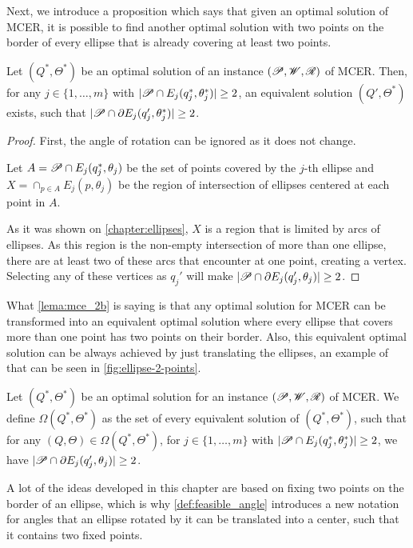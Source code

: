 Next, we introduce a proposition which says that given an optimal solution of MCER, it is possible to find another optimal solution with two points on the border of every ellipse that is already covering at least two points.

\begin{proposicao}\label{lema:mce_2b}
	Let $(Q^*, \Theta^*)$ be an optimal solution of an instance $(\mathscr{P}, \mathscr{W}, \mathscr{R})$ of MCER. 
	Then, for any $j\in\{1, \dots, m\}$ with $|\mathscr{P} \cap E_j(q_j^*, \theta_j^*)|\ge2$, 
	an equivalent solution $(Q', \Theta^*)$ exists, such that $|\mathscr{P} \cap \partial E_j(q_j', \theta_j^*)|\ge 2$.
\end{proposicao}

\begin{proof}
	First, the angle of rotation can be ignored as it does not change.
	
	Let $A=\mathscr{P} \cap E_j(q_j^*, \theta_j)$ be the set of points covered by the $j$-th ellipse and $X=\cap_{p \in A}E_j(p, \theta_j)$ be the region of intersection of ellipses centered at each point in $A$.

	As it was shown on \autoref{chapter:ellipses}, $X$ is a region that is limited by arcs of ellipses. As this region is the non-empty intersection of more than one ellipse, there are at least two of these arcs that encounter at one point, creating a vertex. Selecting any of these vertices as $q_j'$ will make $|\mathscr{P} \cap \partial E_j(q_j', \theta_j)| \ge 2$.
	
\end{proof}

What \autoref{lema:mce_2b} is saying is that any optimal solution for MCER can be transformed into an equivalent optimal solution where every ellipse that covers more than one point has two points on their border. Also, this equivalent optimal solution can be always achieved by just translating the ellipses, an example of that can be seen in \autoref{fig:ellipse-2-points}.

\begin{definicao}
	Let $(Q^*, \Theta^*)$ be an optimal solution for an instance $(\mathscr{P}, \mathscr{W}, \mathscr{R})$ of MCER. We define $\Omega(Q^*, \Theta^*)$ as the set of every equivalent solution of $(Q^*, \Theta^*)$, such that for any $(Q, \Theta)\in\Omega(Q^*, \Theta^*)$, for $j\in\{1, \dots, m\}$ with $|\mathscr{P} \cap E_j(q_j^*, \theta_j^*)|\ge2$, we have $|\mathscr{P} \cap \partial E_j(q_j', \theta_j)| \ge 2$.
\end{definicao}

A lot of the ideas developed in this chapter are based on fixing two points on the border of an ellipse, which is why \autoref{def:feasible_angle} introduces a new notation for angles that an ellipse rotated by it can be translated into a center, such that it contains two fixed points. 

